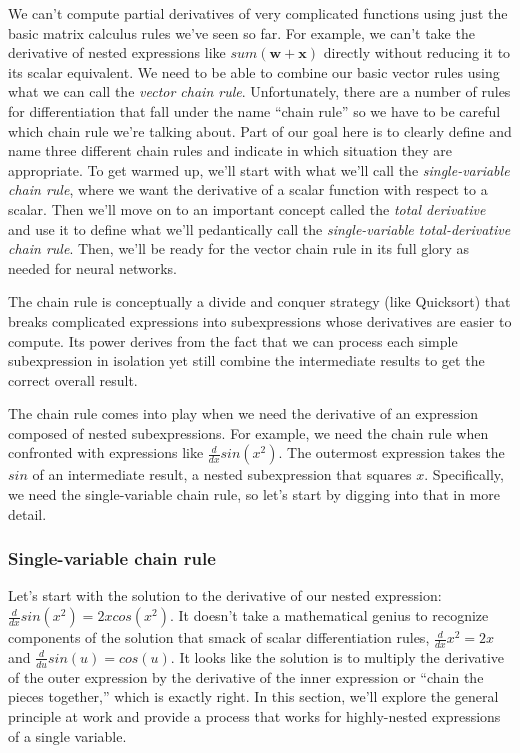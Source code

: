 \documentclass[11pt]{article}
\begin{document}
We can't compute partial derivatives of very complicated functions using just the basic matrix calculus rules we've seen so far.  For example, we can't take the derivative of nested expressions like $sum(\mathbf{w}+\mathbf{x})$ directly without reducing it to its scalar equivalent. We need to be able to combine our basic vector rules using what we can call the {\em vector chain rule}.   Unfortunately, there are a number of rules for differentiation that fall under the name ``chain rule'' so we have to be careful which chain rule we're talking about. Part of our goal here is to clearly define and name three different chain rules and indicate in which situation they are appropriate. To get warmed up, we'll start with what we'll call the {\em single-variable chain rule}, where we want the derivative of a scalar function with respect to a scalar. Then we'll move on to an important concept called the {\em total derivative} and use it to define what we'll pedantically call the {\em single-variable total-derivative chain rule}. Then, we'll be ready for the vector chain rule in its full glory as needed for neural networks.

The chain rule is conceptually a divide and conquer strategy (like Quicksort) that breaks complicated expressions into subexpressions whose derivatives are easier to compute.  Its power derives from the fact that we can process each simple subexpression in isolation yet still combine the  intermediate results to get the correct overall result.

The chain rule comes into play when we need the derivative of an expression composed of nested subexpressions. For example, we need the chain rule when confronted with expressions like $\frac{d}{dx} sin(x^2)$.  The outermost expression takes the $sin$ of an intermediate result, a nested subexpression that squares $x$. Specifically, we need the single-variable chain rule, so let's start by digging into that in more detail.

\subsubsection{Single-variable chain rule}

Let's start with the solution to the derivative of our nested expression: $\frac{d}{dx} sin(x^2) = 2xcos(x^2)$.  It doesn't take a mathematical genius to recognize components of the solution that smack of scalar differentiation rules, $\frac{d}{dx}x^2 = 2x$ and $\frac{d}{du} sin(u) = cos(u)$. It looks like the solution is to multiply the derivative of the outer expression by the derivative of the inner expression or ``chain the pieces together,'' which is exactly right. In this section, we'll explore the general principle at work and provide a process that works for highly-nested expressions of a single variable.
\end{document}
